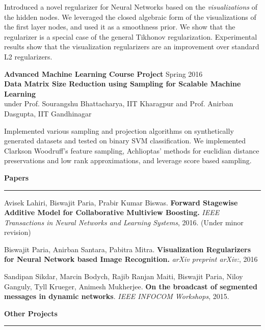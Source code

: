 \documentclass[10pt]{article}
\newcommand{\heading}[1]{
 {\large \textbf{#1}}
  \vspace{0.4em}
  \hrule
  \vspace{0.4em}
}
\newcommand{\EntryGap}{\vspace{0.5cm}}
\newcommand{\SmallEntryGap}{\vspace{0.2cm}}
\newcommand{\indentedpar}[1]{
  \hangindent=1cm \hangafter=0 #1
}
\begin{document}
\SmallEntryGap

\indentedpar{
    Introduced a novel regularizer for Neural Networks
    based on the \emph{visualizations} of the hidden nodes. 
    We leveraged the closed algebraic form of the
    visualizations of the first layer nodes, and used it as a smoothness prior.
    We show that the regularizer is a special case of the 
    general Tikhonov regularization. Experimental results show that the 
    visualization regularizers are an improvement over standard L2 regularizers.
}

\SmallEntryGap

\textbf{Advanced Machine Learning Course Project} \hfill Spring 2016 \\
\textbf{Data Matrix Size Reduction using Sampling for Scalable Machine Learning}\\
under Prof. Sourangshu Bhattacharya, IIT Kharagpur and Prof. Anirban Dasgupta, IIT Gandhinagar

\SmallEntryGap

\indentedpar{
  Implemented various sampling and projection algorithms on synthetically generated
  datasets and tested on binary SVM classification. We implemented Clarkson Woodruff's
  feature sampling, Achlioptas' methods for euclidian distance preservations and 
  low rank approximations, and leverage score based sampling.
}


\EntryGap

\heading{Papers}
  \SmallEntryGap
  Avisek Lahiri, Biswajit Paria, Prabir Kumar Biswas. 
  \textbf{Forward Stagewise Additive Model for Collaborative Multiview Boosting.}
  \emph{IEEE Transactions in Neural Networks and Learning Systems}, 2016.
  (Under minor revision)
  
  \SmallEntryGap
  Biswajit Paria, Anirban Santara, Pabitra Mitra.
  \textbf{Visualization Regularizers for Neural Network based Image Recognition.}
  \emph{arXiv preprint arXiv:}, 2016
  
  \SmallEntryGap
  Sandipan Sikdar, Marcin Bodych, Rajib Ranjan Maiti, Biswajit Paria, 
  Niloy Ganguly, Tyll Krueger, Animesh Mukherjee.
  \textbf{On the broadcast of segmented messages in dynamic networks}.
  \emph{IEEE INFOCOM Workshops}, 2015.



\EntryGap

\heading{Other Projects}
  \SmallEntryGap
  
\end{document}
